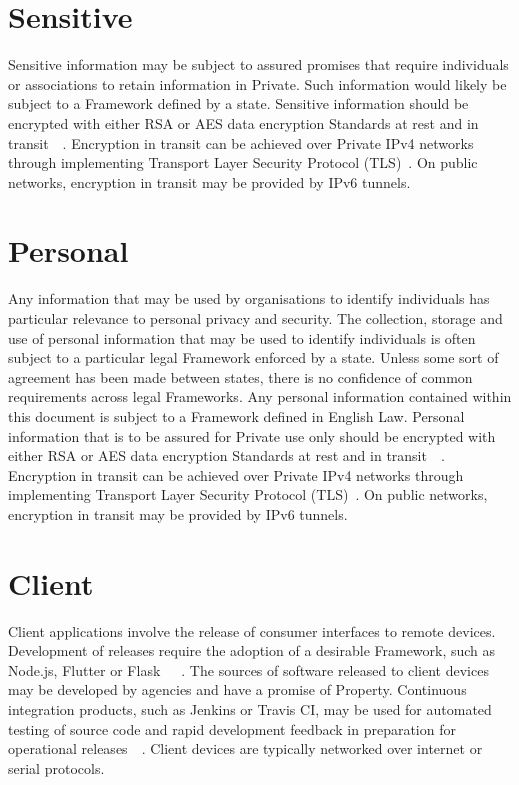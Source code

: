 \documentclass[11pt, oneside]{book}   	%
\begin{document}
\section{Sensitive}
Sensitive information may be subject to assured promises that require individuals or associations to retain information in Private.
Such information would likely be subject to a Framework defined by a state.
Sensitive information should be encrypted with either RSA or AES data encryption Standards at rest and in transit~\cite{rsa}~\cite{aes}.
Encryption in transit can be achieved over Private IPv4 networks through implementing Transport Layer Security Protocol (TLS)~\cite{tlsp}.
On public networks, encryption in transit may be provided by IPv6 tunnels.

\section{Personal}
Any information that may be used by organisations to identify individuals has particular relevance to personal privacy and security.
The collection, storage and use of personal information that may be used to identify individuals is often subject to a particular legal Framework enforced by a state.
Unless some sort of agreement has been made between states, there is no confidence of common requirements across legal Frameworks.
Any personal information contained within this document is subject to a Framework defined in English Law.
Personal information that is to be assured for Private use only should be encrypted with either RSA or AES data encryption Standards at rest and in transit~\cite{rsa}~\cite{aes}.
Encryption in transit can be achieved over Private IPv4 networks through implementing Transport Layer Security Protocol (TLS)~\cite{tlsp}.
On public networks, encryption in transit may be provided by IPv6 tunnels.

\section{Client}
Client applications involve the release of consumer interfaces to remote devices.
Development of releases require the adoption of a desirable Framework, such as Node.js, Flutter or Flask~\cite{node}~\cite{flutter}~\cite{flask}.
The sources of software released to client devices may be developed by agencies and have a promise of Property.
Continuous integration products, such as Jenkins or Travis CI, may be used for automated testing of source code and rapid development feedback in preparation for operational releases~\cite{jenkins}~\cite{travis}.
Client devices are typically networked over internet or serial protocols.\
\end{document}
